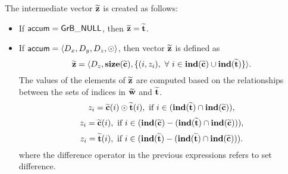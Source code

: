 The intermediate vector ${\bf \widetilde{z}}$ is created as follows:
\begin{itemize}
    \item If ${\sf accum} = {\sf GrB\_NULL}$, then 
    ${\bf \widetilde{z}} = {\bf \widetilde{t}}$.

    \item If ${\sf accum} = \langle D_x, D_y, D_z, \odot \rangle$, then vector 
    ${\bf \widetilde{z}}$ is defined as 
        \[ 
        {\bf \widetilde{z}} = 
        \langle D_z, \bold{size}({\bf \widetilde{c}}), 
        \{(i,z_{i}),   
        \ \forall \ i \in \bold{ind}({\bf \widetilde{c}}) \cup 
        \bold{ind}({\bf \widetilde{t}}) \} \rangle.\]
    The values of the elements of ${\bf \widetilde{z}}$ are computed based on the relationships between the sets of indices in ${\bf \widetilde{w}}$ and ${\bf \widetilde{t}}$.
\[
z_{i} = {\bf \widetilde{c}}(i) \odot {\bf \widetilde{t}}(i), \ \mbox{if}\  
i \in  (\bold{ind}({\bf \widetilde{t}}) \cap \bold{ind}({\bf \widetilde{c}})),
\]
\[
z_{i} = {\bf \widetilde{c}}(i), \ \mbox{if}\  i \in  (\bold{ind}(
{\bf \widetilde{c}}) - (\bold{ind}({\bf \widetilde{t}}) \cap 
\bold{ind}({\bf \widetilde{c}}))),
\]
\[
z_{i} = {\bf \widetilde{t}}(i), \ \mbox{if}\  i \in  (\bold{ind}(
{\bf \widetilde{t}}) - (\bold{ind}({\bf \widetilde{t}}) \cap 
\bold{ind}({\bf \widetilde{c}}))).
\]
where the difference operator in the previous expressions refers to set difference.
\end{itemize}

